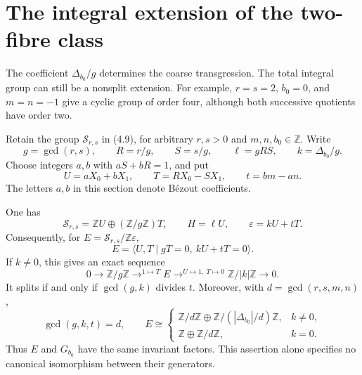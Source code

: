 \section{The integral extension of the two-fibre class}

The coefficient $\Delta_{b_0}/g$ determines the coarse transgression.
The total integral group can still be a nonsplit extension.  For example,
$r=s=2$, $b_0=0$, and $m=n=-1$ give a cyclic group of order four,
although both successive quotients have order two.

Retain the group $\mathcal S_{r,s}$ in (4.9), for arbitrary $r,s>0$ and
$m,n,b_0\in\mathbb Z$.  Write
\[
 g=\gcd(r,s),\qquad R=r/g,\qquad S=s/g,\qquad
 \ell=gRS,\qquad k=\Delta_{b_0}/g.
\]
Choose integers $a,b$ with $aS+bR=1$, and put
\begin{equation}\label{eq:seifert-split}
 U=aX_0+bX_1,\qquad T=RX_0-SX_1,\qquad t=bm-an.
\end{equation}
The letters $a,b$ in this section denote B\'ezout coefficients.

\begin{theorem}\label{thm:extension}
One has
\begin{equation}\label{eq:class-coordinates}
 \mathcal S_{r,s}=\mathbb ZU\oplus(\mathbb Z/g\mathbb Z)T,
 \qquad H=\ell U,\qquad \varepsilon=kU+tT.
\end{equation}
Consequently, for $E=\mathcal S_{r,s}/\mathbb Z\varepsilon$,
\begin{equation}\label{eq:extension-presentation}
 E=\langle U,T\mid gT=0,\ kU+tT=0\rangle.
\end{equation}
If $k\ne0$, this gives an exact sequence
\begin{equation}\label{eq:extension-sequence}
 0\longrightarrow\mathbb Z/g\mathbb Z
 \mathrel{\mathop{\longrightarrow}^{1\mapsto T}}E
 \mathrel{\mathop{\longrightarrow}^{U\mapsto1,\ T\mapsto0}}
 \mathbb Z/|k|\mathbb Z\longrightarrow0.
\end{equation}
It splits if and only if $\gcd(g,k)$ divides $t$.
Moreover, with $d=\gcd(r,s,m,n)$,
\[
 \gcd(g,k,t)=d,\qquad
 E\cong
 \begin{cases}
 \mathbb Z/d\mathbb Z\oplus\mathbb Z/(|\Delta_{b_0}|/d)\mathbb Z,
       &k\ne0,\\
 \mathbb Z\oplus\mathbb Z/d\mathbb Z,&k=0.
 \end{cases}
\]
Thus $E$ and $G_{b_0}$ have the same invariant factors.
This assertion alone specifies no canonical isomorphism between their generators.
\end{theorem}

